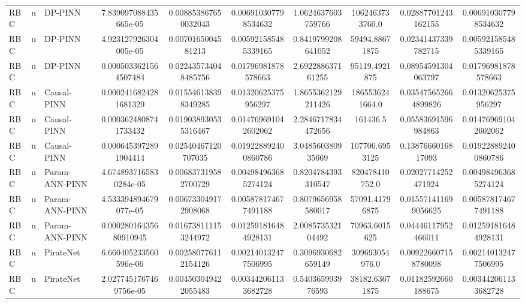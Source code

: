 \begin{landscape}
\begin{longtable}{lllccccccc}
 RBC &     u &        DP-PINN &  7.839097088435665e-05 &   0.008853867650032043 &   0.006910307798534632 &   1.0624637603759766 &       1062463733760.0 &   0.02887701243162155 &   0.006910307798534632 \\
 RBC &     u &        DP-PINN &  4.923127926304005e-05 &     0.0070165004581213 &   0.005921585485339165 &   0.8419799208641052 &        59494.88671875 &   0.02341437339782715 &   0.005921585485339165 \\
 RBC &     u &        DP-PINN &  0.0005033621564507484 &   0.022435734048485756 &    0.01796981878578663 &    2.692288637161255 &         95119.4921875 &   0.08954591304063797 &    0.01796981878578663 \\
 RBC &     u &    Causal-PINN &  0.0002416824281681329 &   0.015546138398349285 &    0.01320625375956297 &   1.8655362129211426 &       1865536241664.0 &  0.035475652664899826 &    0.01320625375956297 \\
 RBC &     u &    Causal-PINN &  0.0003624808741733432 &   0.019038930535316467 &   0.014769691042602062 &   2.2846717834472656 &              161436.5 &   0.05583691596984863 &   0.014769691042602062 \\
 RBC &     u &    Causal-PINN &  0.0006453972891904414 &    0.02540467120707035 &   0.019228892400860786 &    3.048560380935669 &        107706.6953125 &    0.1387666016817093 &   0.019228892400860786 \\
 RBC &     u & Param-ANN-PINN & 4.6748937165830284e-05 &   0.006837319582700729 &   0.004984963685274124 &   0.8204784393310547 &        820478410752.0 &   0.02027714252471924 &   0.004984963685274124 \\
 RBC &     u & Param-ANN-PINN &  4.533394894679077e-05 &   0.006733049172908068 &   0.005878174677491188 &   0.8079656958580017 &        57091.41796875 &  0.015571411699056625 &   0.005878174677491188 \\
 RBC &     u & Param-ANN-PINN & 0.00028016435680910945 &   0.016738111153244972 &   0.012591816484928131 &    2.008573532104492 &         70963.6015625 &   0.04446117952466011 &   0.012591816484928131 \\
 RBC &     u &      PirateNet &  6.660405233560596e-06 &   0.002580776112154126 &   0.002140132477506995 &   0.3096930682659149 &        309693054976.0 &  0.009226607158780098 &   0.002140132477506995 \\
 RBC &     u &      PirateNet & 2.0277451767469756e-05 &   0.004503049422055483 &   0.003442061133682728 &    0.540365993976593 &        38182.63671875 &   0.01182592660188675 &   0.003442061133682728 \\

\end{longtable}
\end{landscape}
